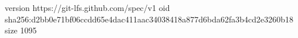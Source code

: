 version https://git-lfs.github.com/spec/v1
oid sha256:d2bb0e71bf06ccdd65e4dac411aac34038418a877d6bda62fa3b4cd2e3260b18
size 1095
